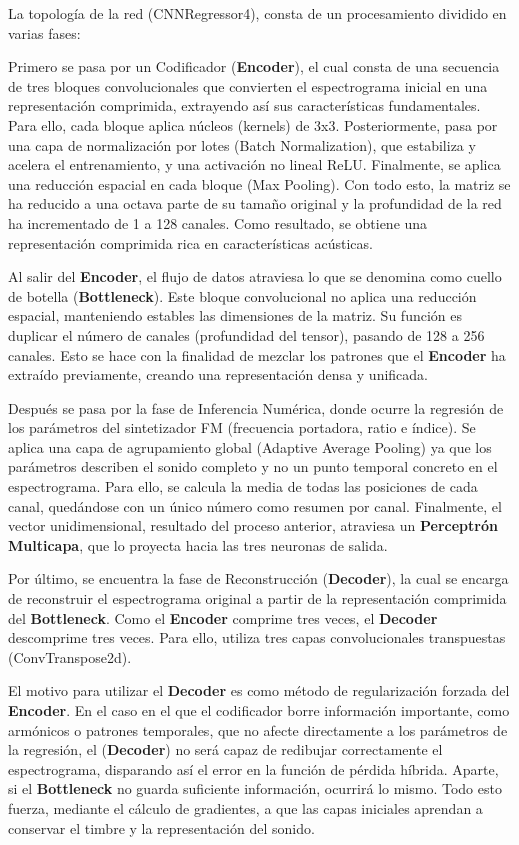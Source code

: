 La topología de la red (CNNRegressor4), consta de un procesamiento dividido en varias fases:

Primero se pasa por un Codificador (\textbf{Encoder}), el cual consta de una secuencia de tres bloques
convolucionales que convierten el espectrograma inicial en una representación comprimida, extrayendo así sus 
características fundamentales. Para ello, cada bloque aplica núcleos (kernels) de 3x3. Posteriormente, 
pasa por una capa de normalización por lotes (Batch Normalization), que estabiliza y acelera el entrenamiento, y 
una activación no lineal ReLU. Finalmente, se aplica una reducción espacial en cada bloque (Max Pooling).
Con todo esto, la matriz se ha reducido a una octava parte de su tamaño original y la profundidad de la red
ha incrementado de 1 a 128 canales. Como resultado, se obtiene una representación comprimida
rica en características acústicas.

Al salir del \textbf{Encoder}, el flujo de datos atraviesa lo que se denomina como
cuello de botella (\textbf{Bottleneck}). Este bloque convolucional no
aplica una reducción espacial, manteniendo estables las dimensiones de la matriz. Su función es duplicar el número
de canales (profundidad del tensor), pasando de 128 a 256 canales. Esto se hace con la finalidad de 
mezclar los patrones que el \textbf{Encoder} ha extraído previamente, creando una representación
densa y unificada.

Después se pasa por la fase de Inferencia Numérica, donde ocurre la regresión de los parámetros del sintetizador FM
(frecuencia portadora, ratio e índice). Se aplica una capa de agrupamiento global (Adaptive Average Pooling) ya que los 
parámetros describen el sonido completo y no un punto temporal concreto en el espectrograma.
Para ello, se calcula la media de todas las posiciones de cada canal, quedándose con un único
número como resumen por canal. Finalmente, el vector unidimensional, resultado del proceso anterior,
atraviesa un \textbf{Perceptrón Multicapa}, que lo proyecta hacia las tres neuronas de salida.

Por último, se encuentra la fase de Reconstrucción (\textbf{Decoder}), la cual se encarga de reconstruir 
el espectrograma original a partir de la representación comprimida del \textbf{Bottleneck}. 
Como el \textbf{Encoder} comprime tres veces, el \textbf{Decoder} descomprime tres veces. Para ello,
utiliza tres capas convolucionales transpuestas (ConvTranspose2d).

El motivo para utilizar el \textbf{Decoder} es como método de regularización forzada del \textbf{Encoder}.
En el caso en el que el codificador borre información importante, como armónicos o patrones temporales, que no afecte directamente a los parámetros
de la regresión, el (\textbf{Decoder}) no será capaz de redibujar correctamente el espectrograma, disparando así
el error en la función de pérdida híbrida. Aparte, si el \textbf{Bottleneck} no guarda suficiente información, ocurrirá lo mismo.
Todo esto fuerza, mediante el cálculo de gradientes, a que las capas iniciales aprendan a conservar el timbre y la representación
del sonido.

